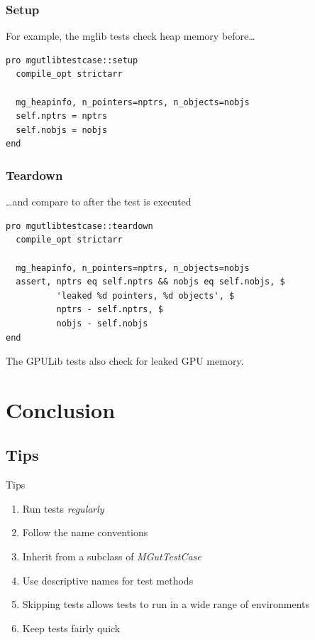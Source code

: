 \documentclass[12pt, handout]{beamer}
\begin{document}
\begin{frame}[t, fragile]
  \frametitle{Setup}

For example, the mglib tests check heap memory before\ldots
\begin{lstlisting}[basicstyle=\ttfamily\fontsize{10pt}{10pt}\selectfont]
pro mgutlibtestcase::setup
  compile_opt strictarr

  mg_heapinfo, n_pointers=nptrs, n_objects=nobjs
  self.nptrs = nptrs
  self.nobjs = nobjs
end
\end{lstlisting}
\end{frame}

\begin{frame}[t, fragile]
  \frametitle{Teardown}

\ldots and compare to after the test is executed
\begin{lstlisting}[basicstyle=\ttfamily\fontsize{10pt}{10pt}\selectfont]
pro mgutlibtestcase::teardown
  compile_opt strictarr

  mg_heapinfo, n_pointers=nptrs, n_objects=nobjs
  assert, nptrs eq self.nptrs && nobjs eq self.nobjs, $
          'leaked %d pointers, %d objects', $
          nptrs - self.nptrs, $
          nobjs - self.nobjs
end
\end{lstlisting}
The GPULib tests also check for leaked GPU memory.
\end{frame}

\section{Conclusion}

\subsection{Tips}
\begin{frame}[t]{Tips}
  \begin{enumerate}
    \item Run tests {\em regularly}
    \item Follow the name conventions
    \item Inherit from a subclass of {\em MGutTestCase}
    \item Use descriptive names for test methods
    \item Skipping tests allows tests to run in a wide range of environments
    \item Keep tests fairly quick
  \end{enumerate}
\end{frame}
\end{document}
